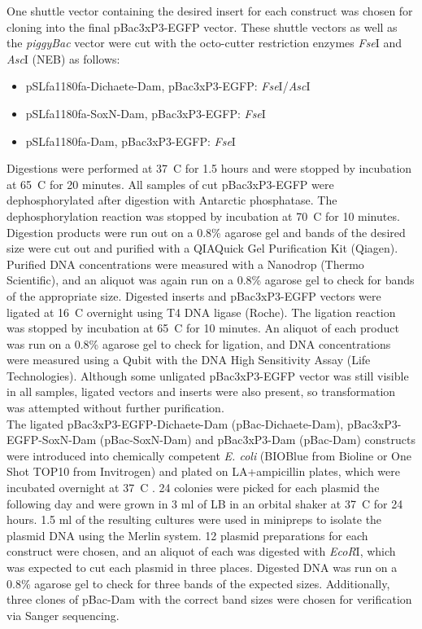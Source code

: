 One shuttle vector containing the desired insert for each construct was chosen for cloning into the final pBac{3xP3-EGFP} vector. These shuttle vectors as well as the \emph{piggyBac} vector were cut with the octo-cutter restriction enzymes \emph{Fse}I and \emph{Asc}I (NEB) as follows:  
\begin{itemize}
	\item pSLfa1180fa-Dichaete-Dam, pBac{3xP3-EGFP}: \emph{Fse}I/\emph{Asc}I
	\item pSLfa1180fa-SoxN-Dam, pBac{3xP3-EGFP}: \emph{Fse}I
	\item pSLfa1180fa-Dam, pBac{3xP3-EGFP}: \emph{Fse}I
\end{itemize}
Digestions were performed at 37\degree~C for 1.5 hours and were stopped by incubation at 65\degree~C for 20 minutes. All samples of cut pBac{3xP3-EGFP} were dephosphorylated after digestion with Antarctic phosphatase. The dephosphorylation reaction was stopped by incubation at 70\degree~C for 10 minutes. Digestion products were run out on a 0.8\% agarose gel and bands of the desired size were cut out and purified with a QIAQuick Gel Purification Kit (Qiagen). Purified DNA concentrations were measured with a Nanodrop (Thermo Scientific), and an aliquot was again run on a 0.8\% agarose gel to check for bands of the appropriate size. Digested inserts and pBac{3xP3-EGFP} vectors were ligated at 16\degree~C overnight using T4 DNA ligase (Roche). The ligation reaction was stopped by incubation at 65\degree~C for 10 minutes. An aliquot of each product was run on a 0.8\% agarose gel to check for ligation, and DNA concentrations were measured using a Qubit with the DNA High Sensitivity Assay (Life Technologies). Although some unligated pBac{3xP3-EGFP} vector was still visible in all samples, ligated vectors and inserts were also present, so transformation was attempted without further purification.\\

The ligated pBac{3xP3-EGFP}-Dichaete-Dam (pBac-Dichaete-Dam), pBac{3xP3-EGFP}-SoxN-Dam (pBac-SoxN-Dam) and pBac{3xP3}-Dam (pBac-Dam) constructs were introduced into chemically competent \emph{E. coli} (BIOBlue from Bioline or One Shot TOP10 from Invitrogen) and plated on LA+ampicillin plates, which were incubated overnight at 37\degree~C . 24 colonies were picked for each plasmid the following day and were grown in 3 ml of LB in an orbital shaker at 37\degree~C for 24 hours. 1.5 ml of the resulting cultures were used in minipreps to isolate the plasmid DNA using the Merlin system. 12 plasmid preparations for each construct were chosen, and an aliquot of each was digested with \emph{EcoR}I, which was expected to cut each plasmid in three places. Digested DNA was run on a 0.8\% agarose gel to check for three bands of the expected sizes. Additionally, three clones of pBac-Dam with the correct band sizes were chosen for verification via Sanger sequencing.\\

